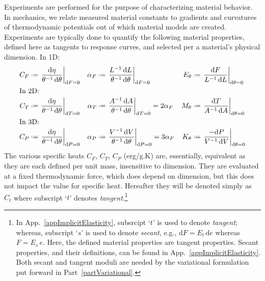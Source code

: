 Experiments are performed for the purpose of characterizing material behavior.  In mechanics, we relate measured material constants to gradients and curvatures of thermo\-dynamic potentials out of which material models are created.  Experiments are typically done to quantify the following material properties, defined here as tangents to response curves, and selected per a material's physical dimension. 
\newline
In 1D:
\begin{subequations}
    \label{materialConstants}
    \begin{align}
    C_F & \defeq \left. \frac{\mathrm{d} \eta}
    {\theta^{-1} \, \mathrm{d}\theta} \right|_{\mathrm{d}F=0} & 
    \alpha_F & \defeq \left. \frac{L^{-1} \, \mathrm{d}L}
    {\theta^{-1} \, \mathrm{d} \theta} \right|_{\mathrm{d}F=0} &
    E_{\theta} & \defeq \left. \frac{\mathrm{d}F}
    {L^{-1} \, \mathrm{d}L} \right|_{\mathrm{d}\theta=0} \\
    \intertext{In 2D:}
    C_T & \defeq \left. \frac{\mathrm{d} \eta}
    {\theta^{-1} \, \mathrm{d}\theta} \right|_{\mathrm{d}T=0} & 
    \alpha_T & \defeq \left. \frac{A^{-1} \, \mathrm{d}A}
    {\theta^{-1} \, \mathrm{d} \theta} \right|_{\mathrm{d}T=0} =
    2 \alpha_F &
    M_{\theta} & \defeq \left. \frac{\mathrm{d}T}
    {A^{-1} \, \mathrm{d}A} \right|_{\mathrm{d}\theta=0} \\
    \intertext{In 3D:}
    C_P & \defeq \left. \frac{\mathrm{d} \eta}
    {\theta^{-1} \, \mathrm{d}\theta} \right|_{\mathrm{d}P=0} & 
    \alpha_P & \defeq \left. \frac{V^{-1} \, \mathrm{d}V}
    {\theta^{-1} \, \mathrm{d} \theta} \right|_{\mathrm{d}P=0} = 
    3 \alpha_F &
    K_{\theta} & \defeq \left. \frac{-\mathrm{d}P}
    {V^{-1} \, \mathrm{d}V} \right|_{\mathrm{d}\theta=0} 
    \end{align}
\end{subequations}
The various specific heats $C_F$, $C_T$, $C_P$ (erg/g.K) are, essentially, equivalent as they are each defined per unit mass, insensitive to dimension.  They are evaluated at a fixed thermo\-dynamic force, which does depend on dimension, but this does not impact the value for specific heat.  Hereafter they will be denoted simply as $C_t$ where subscript `$t$' denotes \textit{tangent}.\footnote{
    In App.~\ref{appImplicitElasticity}, subsrcipt `$t$' is used to denote \textit{tangent\/}; whereas, subscript `$s$' is used to denote \textit{secant}, e.g., $\mathrm{d}F = E_t \, \mathrm{d} e$ whereas $F = E_s \, e$.  Here, the defined material properties are tangent properties.  Secant properties, and their definitions, can be found in App.~\ref{appImplicitElasticity}.  Both secant and tangent moduli are needed by the variational formulation put forward in Part~\ref{partVariational}.
}

